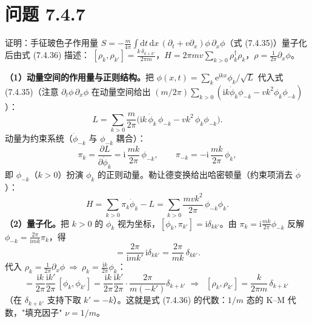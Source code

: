 \section*{问题 7.4.7}
\begin{problem}
证明：手征玻色子作用量 $S=-\frac{m}{4\pi}\int\mathrm{d}t\,\mathrm{d}x\,(\partial_t+v\partial_x)\phi\,\partial_x\phi$（式 (7.4.35)）量子化后由式 (7.4.36) 描述：
$[\rho_k,\rho_{k'}]=\frac{k\,\delta_{k+k'}}{2\pi m}$，$H=2\pi mv\sum_{k>0}\rho_k^{\dagger}\rho_k$，$\rho=\frac{1}{2\pi}\partial_x\phi$。
\end{problem}
\solution
\textbf{（1）动量空间的作用量与正则结构。}把 $\phi(x,t)=\sum_k\mathrm{e}^{\mathrm{i}kx}\phi_k/\sqrt{L}$ 代入式 (7.4.35)（注意 $\partial_t\phi\,\partial_x\phi$ 在动量空间给出 $(m/2\pi)\sum_{k>0}(\mathrm{i}k\dot{\phi}_k\phi_{-k}-vk^2\phi_k\phi_{-k})$）：
\begin{equation*}
L=\sum_{k>0}\frac{m}{2\pi}\Big(\mathrm{i}k\,\dot{\phi}_k\,\phi_{-k}-vk^2\,\phi_k\phi_{-k}\Big) .
\end{equation*}
动量为约束系统（$\dot{\phi}_{-k}$ 与 $\phi_{-k}$ 耦合）：
\begin{equation*}
\pi_k=\frac{\partial L}{\partial\dot{\phi}_k}=\mathrm{i}\,\frac{mk}{2\pi}\,\phi_{-k},
\qquad
\pi_{-k}=-\mathrm{i}\,\frac{mk}{2\pi}\,\phi_k ,
\end{equation*}
即 $\phi_{-k}$（$k>0$）扮演 $\phi_k$ 的正则动量。勒让德变换给出哈密顿量（约束项消去 $\dot{\phi}$）：
\begin{equation*}
H=\sum_{k>0}\pi_k\dot{\phi}_k-L
=\sum_{k>0}\frac{mvk^2}{2\pi}\,\phi_{-k}\phi_k .
\end{equation*}
\textbf{（2）量子化。}把 $k>0$ 的 $\phi_k$ 视为坐标，$[\phi_k,\pi_{k'}]=\mathrm{i}\delta_{kk'}$。由 $\pi_k=\mathrm{i}\frac{mk}{2\pi}\phi_{-k}$ 反解 $\phi_{-k}=\frac{2\pi}{\mathrm{i}mk}\pi_k$，得
\begin{equation*}
[\phi_k,\phi_{-k'}]=\frac{2\pi}{\mathrm{i}mk'}\,\mathrm{i}\delta_{kk'}=\frac{2\pi}{mk}\,\delta_{kk'} .
\end{equation*}
代入 $\rho_k=\frac{1}{2\pi}\partial_x\phi\ \Rightarrow\ \rho_k=\frac{\mathrm{i}k}{2\pi}\phi_k$：
\begin{equation*}
[\rho_k,\rho_{k'}]=\frac{\mathrm{i}k}{2\pi}\frac{\mathrm{i}k'}{2\pi}\,[\phi_k,\phi_{k'}]
=\frac{\mathrm{i}k}{2\pi}\frac{\mathrm{i}k'}{2\pi}\cdot\frac{2\pi}{m(-k')}\delta_{k+k'}
\;\Longrightarrow\;
\boxed{\;[\rho_k,\rho_{k'}]=\frac{k}{2\pi m}\,\delta_{k+k'}\;}
\end{equation*}
（在 $\delta_{k+k'}$ 支持下取 $k'=-k$）。这就是式 (7.4.36) 的代数：$1/m$ 态的 K--M 代数，"填充因子" $\nu=1/m$。

